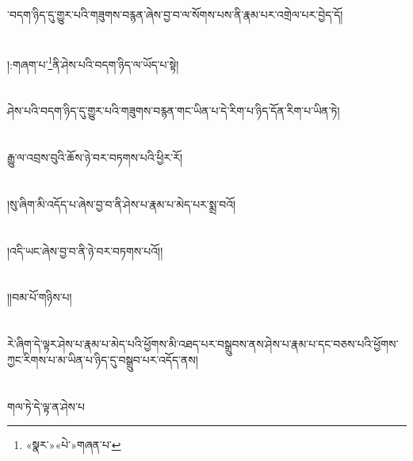 ་བདག་ཉིད་དུ་གྱུར་པའི་གཟུགས་བརྙན་ཞེས་བྱ་བ་ལ་སོགས་པས་ནི་རྣམ་པར་འགྲེལ་པར་བྱེད་དོ།\chapter{ }།:གཞག་པ་\footnote{«སྣར་»«པེ་»གཞན་པ་}ནི་ཤེས་པའི་བདག་ཉིད་ལ་ཡོད་པ་སྟེ།\chapter{ }ཤེས་པའི་བདག་ཉིད་དུ་གྱུར་པའི་གཟུགས་བརྙན་གང་ཡིན་པ་དེ་རིག་པ་ཉིད་དོན་རིག་པ་ཡིན་ཏེ།\chapter{ }རྒྱུ་ལ་འབྲས་བུའི་ཆོས་ཉེ་བར་བཏགས་པའི་ཕྱིར་རོ།\chapter{ }།སུ་ཞིག་མི་འདོད་པ་ཞེས་བྱ་བ་ནི་ཤེས་པ་རྣམ་པ་མེད་པར་སྨྲ་བའོ།\chapter{ }།འདི་ཡང་ཞེས་བྱ་བ་ནི་ཉེ་བར་བཏགས་པའོ།།\chapter{ }།།བམ་པོ་གཉིས་པ།\chapter{ }རེ་ཞིག་དེ་ལྟར་ཤེས་པ་རྣམ་པ་མེད་པའི་ཕྱོགས་མི་འཐད་པར་བསྒྲུབས་ནས་ཤེས་པ་རྣམ་པ་དང་བཅས་པའི་ཕྱོགས་ཀྱང་རིགས་པ་མ་ཡིན་པ་ཉིད་དུ་བསྒྲུབ་པར་འདོད་ནས།\chapter{ }གལ་ཏེ་དེ་ལྟ་ན་ཤེས་པ